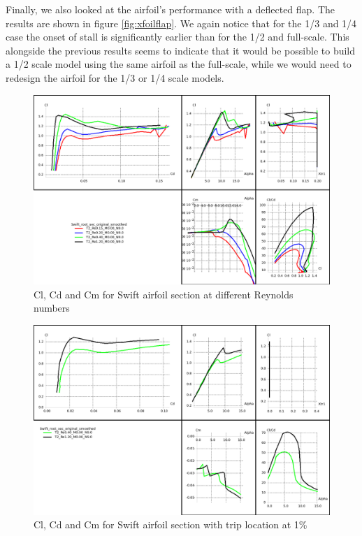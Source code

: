 \documentclass[titlepage,10pt]{article}
\begin{document}
Finally, we also looked at the airfoil's performance with a deflected flap. The results are shown in figure \ref{fig:xfoilflap}. We again notice that for the 1/3 and 1/4 case the onset of stall is significantly earlier than for the 1/2 and full-scale. This alongside the previous results seems to indicate that it would be possible to build a 1/2 scale model using the same airfoil as the full-scale, while we would need to redesign the airfoil for the 1/3 or 1/4 scale models.


\begin{landscape}
	\begin{figure}
	\begin{center}
	\includegraphics[width=220mm]{xfoil_T2_analysis.png}
	\end{center}
	\caption{Cl, Cd and Cm for Swift airfoil section at different Reynolds numbers}
	\label{fig:xfoil1}
	\end{figure}
\end{landscape}

\begin{landscape}
	\begin{figure}
	\begin{center}
	\includegraphics[width=220mm]{xfoil_T2_analysis_stall.png}
	\end{center}
	\caption{Cl, Cd and Cm for Swift airfoil section with trip location at 1\%}
	\label{fig:xfoilstall}
	\end{figure}
\end{landscape}
\end{document}
